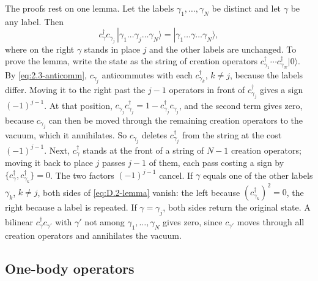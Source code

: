 The proofs rest on one lemma. Let the labels $\gamma_1,\dots,\gamma_N$ be distinct and let $\gamma$ be any label. Then
\begin{equation}
  c^\dagger_\gamma c_{\gamma_j}\,|\gamma_1\dots\gamma_j\dots\gamma_N\rangle = |\gamma_1\dots\gamma\dots\gamma_N\rangle ,
  \label{eq:D.2-lemma}
\end{equation}
where on the right $\gamma$ stands in place $j$ and the other labels are unchanged. To prove the lemma, write the state as the string of creation operators $c^\dagger_{\gamma_1}\cdots c^\dagger_{\gamma_N}|0\rangle$. By \cref{eq:2.3-anticomm}, $c_{\gamma_j}$ anticommutes with each $c^\dagger_{\gamma_k}$, $k \ne j$, because the labels differ. Moving it to the right past the $j - 1$ operators in front of $c^\dagger_{\gamma_j}$ gives a sign $(-1)^{j-1}$. At that position, $c_{\gamma_j}c^\dagger_{\gamma_j} = 1 - c^\dagger_{\gamma_j}c_{\gamma_j}$, and the second term gives zero, because $c_{\gamma_j}$ can then be moved through the remaining creation operators to the vacuum, which it annihilates. So $c_{\gamma_j}$ deletes $c^\dagger_{\gamma_j}$ from the string at the cost $(-1)^{j-1}$. Next, $c^\dagger_\gamma$ stands at the front of a string of $N - 1$ creation operators; moving it back to place $j$ passes $j - 1$ of them, each pass costing a sign by $\{c^\dagger_\gamma, c^\dagger_{\gamma_k}\} = 0$. The two factors $(-1)^{j-1}$ cancel. If $\gamma$ equals one of the other labels $\gamma_k$, $k \ne j$, both sides of \cref{eq:D.2-lemma} vanish: the left because $(c^\dagger_{\gamma_k})^2 = 0$, the right because a label is repeated. If $\gamma = \gamma_j$, both sides return the original state. A bilinear $c^\dagger_\gamma c_{\gamma'}$ with $\gamma'$ not among $\gamma_1,\dots,\gamma_N$ gives zero, since $c_{\gamma'}$ moves through all creation operators and annihilates the vacuum.

\subsection*{One-body operators}

